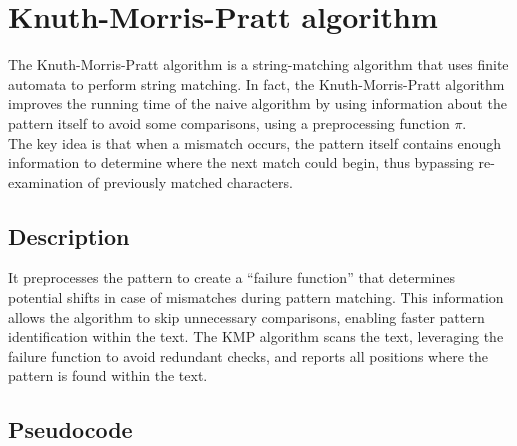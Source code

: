 \documentclass[11pt]{article}
\begin{document}
    \section{Knuth-Morris-Pratt algorithm} \label{sec:knuth_morris_pratt_algorithm}

        The Knuth-Morris-Pratt algorithm is a string-matching algorithm that uses finite automata to perform string matching.
        In fact, the Knuth-Morris-Pratt algorithm improves the running time of the naive algorithm by using information about the pattern itself to avoid some comparisons, using a preprocessing function \textbf{$\pi$}. \\
        The key idea is that when a mismatch occurs, the pattern itself contains enough information to determine where the next match could begin, thus bypassing re-examination of previously matched characters.

        \subsection{Description}\label{subsec:kmp_description}

             It preprocesses the pattern to create a ``failure function'' that determines potential shifts in case of mismatches during pattern matching.
             This information allows the algorithm to skip unnecessary comparisons, enabling faster pattern identification within the text.
             The KMP algorithm scans the text, leveraging the failure function to avoid redundant checks, and reports all positions where the pattern is found within the text.

        \subsection{Pseudocode} \label{subsec:kmp_pseudocode}
\end{document}
